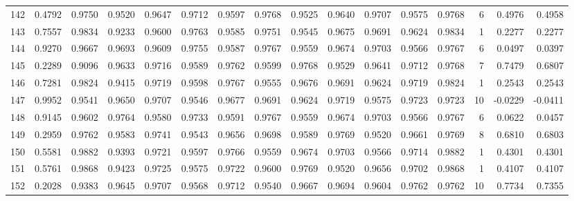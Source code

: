 \begin{tabular}{lrrrrrrrrrrrrrrr}
142 &      0.4792 &  0.9750 &  0.9520 &  0.9647 &  0.9712 &  0.9597 &  0.9768 &  0.9525 &  0.9640 &  0.9707 &   0.9575 &     0.9768 &      6 &                    0.4976 &                     0.4958 \\
143 &      0.7557 &  0.9834 &  0.9233 &  0.9600 &  0.9763 &  0.9585 &  0.9751 &  0.9545 &  0.9675 &  0.9691 &   0.9624 &     0.9834 &      1 &                    0.2277 &                     0.2277 \\
144 &      0.9270 &  0.9667 &  0.9693 &  0.9609 &  0.9755 &  0.9587 &  0.9767 &  0.9559 &  0.9674 &  0.9703 &   0.9566 &     0.9767 &      6 &                    0.0497 &                     0.0397 \\
145 &      0.2289 &  0.9096 &  0.9633 &  0.9716 &  0.9589 &  0.9762 &  0.9599 &  0.9768 &  0.9529 &  0.9641 &   0.9712 &     0.9768 &      7 &                    0.7479 &                     0.6807 \\
146 &      0.7281 &  0.9824 &  0.9415 &  0.9719 &  0.9598 &  0.9767 &  0.9555 &  0.9676 &  0.9691 &  0.9624 &   0.9719 &     0.9824 &      1 &                    0.2543 &                     0.2543 \\
147 &      0.9952 &  0.9541 &  0.9650 &  0.9707 &  0.9546 &  0.9677 &  0.9691 &  0.9624 &  0.9719 &  0.9575 &   0.9723 &     0.9723 &     10 &                   -0.0229 &                    -0.0411 \\
148 &      0.9145 &  0.9602 &  0.9764 &  0.9580 &  0.9733 &  0.9591 &  0.9767 &  0.9559 &  0.9674 &  0.9703 &   0.9566 &     0.9767 &      6 &                    0.0622 &                     0.0457 \\
149 &      0.2959 &  0.9762 &  0.9583 &  0.9741 &  0.9543 &  0.9656 &  0.9698 &  0.9589 &  0.9769 &  0.9520 &   0.9661 &     0.9769 &      8 &                    0.6810 &                     0.6803 \\
150 &      0.5581 &  0.9882 &  0.9393 &  0.9721 &  0.9597 &  0.9766 &  0.9559 &  0.9674 &  0.9703 &  0.9566 &   0.9714 &     0.9882 &      1 &                    0.4301 &                     0.4301 \\
151 &      0.5761 &  0.9868 &  0.9423 &  0.9725 &  0.9575 &  0.9722 &  0.9600 &  0.9769 &  0.9520 &  0.9656 &   0.9702 &     0.9868 &      1 &                    0.4107 &                     0.4107 \\
152 &      0.2028 &  0.9383 &  0.9645 &  0.9707 &  0.9568 &  0.9712 &  0.9540 &  0.9667 &  0.9694 &  0.9604 &   0.9762 &     0.9762 &     10 &                    0.7734 &                     0.7355 \\

\end{tabular}
